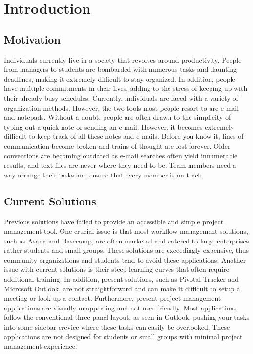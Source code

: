 \chapter{Introduction}

\section{Motivation}

Individuals currently live in a society that revolves around productivity. People from managers to students are bombarded with numerous tasks and daunting deadlines, making it extremely difficult to stay organized. In addition, people have multiple commitments in their lives, adding to the stress of keeping up with their already busy schedules. Currently, individuals are faced with a variety of organization methods. However, the two tools most people resort to are e-mail and notepads. Without a doubt, people are often drawn to the simplicity of typing out a quick note or sending an e-mail. However, it becomes extremely difficult to keep track of all these notes and e-mails. Before you know it, lines of communication become broken and trains of thought are lost forever. Older conventions are becoming outdated as e-mail searches often yield innumerable results, and text files are never where they need to be. Team members need a way arrange their tasks and ensure that every member is on track.

\section{Current Solutions} 

Previous solutions have failed to provide an accessible and simple project management tool. One crucial issue is that most workflow management solutions, such as Asana and Basecamp, are often marketed and catered to large enterprises rather students and small groups. These solutions are exceedingly expensive, thus community organizations and students tend to avoid these applications. Another issue with current solutions is their steep learning curves that often require additional training. In addition, present solutions, such as Pivotal Tracker and Microsoft Outlook, are not straightforward and can make it difficult to setup a meeting or look up a contact. Furthermore, present project management applications are visually unappealing and not user-friendly. Most applications follow the conventional three panel layout, as seen in Outlook, pushing your tasks into some sidebar crevice where these tasks can easily be overlooked. These applications are not designed for students or small groups with minimal project management experience.

